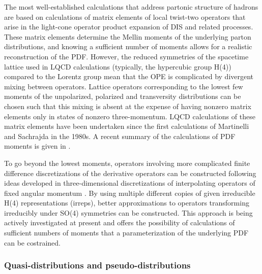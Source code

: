 The most well-established calculations that address partonic structure of hadrons are based on calculations of matrix elements of local twist-two operators that arise in the light-cone operator product expansion of DIS and related processes. These matrix elements determine the Mellin moments of the underlying parton distributions, and knowing a sufficient number of moments allows for a realistic reconstruction of the PDF. However, the reduced symmetries of the spacetime lattice used in LQCD calculations (typically, the hypercubic group H(4)) compared to the Lorentz group mean that the OPE is complicated by divergent mixing between operators.
Lattice operators corresponding to the lowest few moments of the unpolarized, polarized and transversity distributions can be chosen such that this mixing is absent at the expense of having nonzero matrix elements only in states of nonzero three-momentum. LQCD calculations of these matrix elements have been undertaken since the first calculations of Martinelli and Sachrajda \cite{Martinelli:1988XXXXXX} in the 1980s. A recent summary of the calculations of PDF moments is given in \cite{Lin:2017XXXX}.
	
To go beyond the lowest moments, operators involving more complicated finite difference discretizations of the derivative operators can be constructed following ideas developed in three-dimensional discretizations of interpolating operators of fixed angular momentum \cite{}. By using multiple different copies of given irreducible H(4) representations (irreps), better approximations to operators transforming irreducibly under SO(4) symmetries can be constructed. This approach is being actively investigated at present and offers the possibility of calculations of sufficient numbers of moments that a parameterization of the underlying PDF can be costrained.



\subsubsection{Quasi-distributions and pseudo-distributions}


